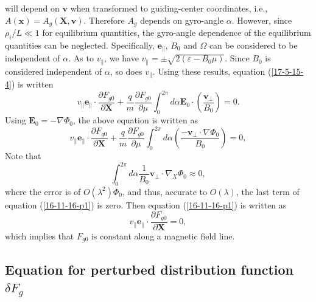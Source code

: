 \documentclass{article}
\begin{document}
will depend on $\mathbf{v}$ when transformed to guiding-center coordinates,
i.e., $A (\mathbf{x}) = A_g (\mathbf{X}, \mathbf{v})$. Therefore $A_g$ depends
on gyro-angle $\alpha$. However, since $\rho_i / L \ll 1$ for equilibrium
quantities, the gyro-angle dependence of the equilibrium quantities can be
neglected. Specifically, $\mathbf{e}_{\parallel}$, $B_0$ and $\Omega$ can be
considered to be independent of $\alpha$. As to $v_{\parallel}$, we have
$v_{\parallel} = \pm \sqrt{2 (\varepsilon - B_0 \mu)}$. Since $B_0$ is
considered independent of $\alpha$, so does $v_{\parallel}$. Using these
results, equation (\ref{17-5-15-4}) is written
\begin{equation}
  v_{\parallel} \mathbf{e}_{\parallel} \cdot \frac{\partial F_{g 0}}{\partial
  \mathbf{X}} + \frac{q}{m}  \frac{\partial F_{g 0}}{\partial \mu} \int_0^{2
  \pi} d \alpha \mathbf{E}_0 \cdot \left( \frac{\mathbf{v}_{\perp}}{B_0}
  \right) = 0.
\end{equation}
Using $\mathbf{E}_0 = - \nabla \Phi_0$, the above equation is written as
\begin{equation}
  \label{16-11-16-p1} v_{\parallel} \mathbf{e}_{\parallel} \cdot
  \frac{\partial F_{g 0}}{\partial \mathbf{X}} + \frac{q}{m}  \frac{\partial
  F_{g 0}}{\partial \mu} \int_0^{2 \pi} d \alpha \left(
  \frac{-\mathbf{v}_{\perp} \cdot \nabla \Phi_0}{B_0}  \right) = 0,
\end{equation}
Note that
\begin{equation}
  \int_0^{2 \pi} d \alpha \frac{1}{B_0} \mathbf{v}_{\perp} \cdot \nabla_X
  \Phi_0 \approx 0,
\end{equation}
where the error is of $O (\lambda^2) \Phi_0$, and thus, accurate to $O
(\lambda)$, the last term of equation (\ref{16-11-16-p1}) is zero. Then
equation (\ref{16-11-16-p1}) is written as
\begin{equation}
  v_{\parallel} \mathbf{e}_{\parallel} \cdot \frac{\partial F_{g 0}}{\partial
  \mathbf{X}} = 0,
\end{equation}
which implies that $F_{g 0}$ is constant along a magnetic field line.

\subsection{Equation for perturbed distribution function $\delta F_g$}
\end{document}
